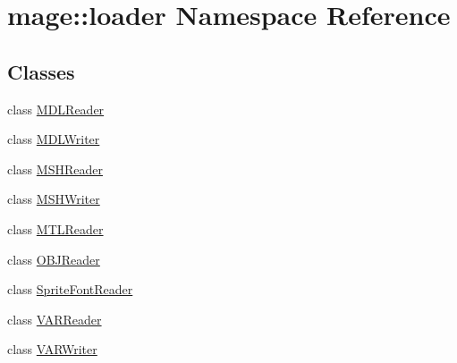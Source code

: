 \hypertarget{namespacemage_1_1loader}{}\section{mage\+:\+:loader Namespace Reference}
\label{namespacemage_1_1loader}
\subsection*{Classes}
\begin{DoxyCompactItemize}
\item 
class \hyperlink{classmage_1_1loader_1_1_m_d_l_reader}{M\+D\+L\+Reader}
\item 
class \hyperlink{classmage_1_1loader_1_1_m_d_l_writer}{M\+D\+L\+Writer}
\item 
class \hyperlink{classmage_1_1loader_1_1_m_s_h_reader}{M\+S\+H\+Reader}
\item 
class \hyperlink{classmage_1_1loader_1_1_m_s_h_writer}{M\+S\+H\+Writer}
\item 
class \hyperlink{classmage_1_1loader_1_1_m_t_l_reader}{M\+T\+L\+Reader}
\item 
class \hyperlink{classmage_1_1loader_1_1_o_b_j_reader}{O\+B\+J\+Reader}
\item 
class \hyperlink{classmage_1_1loader_1_1_sprite_font_reader}{Sprite\+Font\+Reader}
\item 
class \hyperlink{classmage_1_1loader_1_1_v_a_r_reader}{V\+A\+R\+Reader}
\item 
class \hyperlink{classmage_1_1loader_1_1_v_a_r_writer}{V\+A\+R\+Writer}
\end{DoxyCompactItemize}
